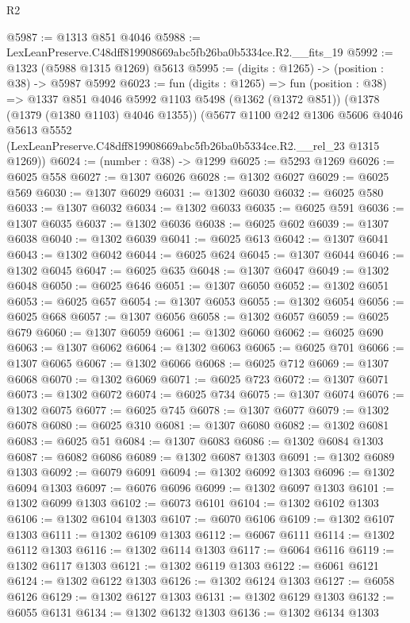 \begin{lexlean}{R2}
\begin{coremodule}
@5987 := @1313 @851 @4046
@5988 := LexLeanPreserve.C48dff819908669abc5fb26ba0b5334ce.R2.__fits_19
@5992 := @1323 (@5988 @1315 @1269) @5613
@5995 := (digits : @1265) -> (position : @38) -> @5987 @5992
@6023 := fun (digits : @1265) =>
  fun (position : @38) =>
  @1337
    @851
    @4046
    @5992
    @1103
    @5498
    (@1362 (@1372 @851))
    (@1378 (@1379 (@1380 @1103) @4046 @1355))
    (@5677
      @1100
      @242
      @1306
      @5606
      @4046
      @5613
      @5552
      (LexLeanPreserve.C48dff819908669abc5fb26ba0b5334ce.R2.__rel_23 @1315 @1269))
@6024 := (number : @38) -> @1299
@6025 := @5293 @1269
@6026 := @6025 @558
@6027 := @1307 @6026
@6028 := @1302 @6027
@6029 := @6025 @569
@6030 := @1307 @6029
@6031 := @1302 @6030
@6032 := @6025 @580
@6033 := @1307 @6032
@6034 := @1302 @6033
@6035 := @6025 @591
@6036 := @1307 @6035
@6037 := @1302 @6036
@6038 := @6025 @602
@6039 := @1307 @6038
@6040 := @1302 @6039
@6041 := @6025 @613
@6042 := @1307 @6041
@6043 := @1302 @6042
@6044 := @6025 @624
@6045 := @1307 @6044
@6046 := @1302 @6045
@6047 := @6025 @635
@6048 := @1307 @6047
@6049 := @1302 @6048
@6050 := @6025 @646
@6051 := @1307 @6050
@6052 := @1302 @6051
@6053 := @6025 @657
@6054 := @1307 @6053
@6055 := @1302 @6054
@6056 := @6025 @668
@6057 := @1307 @6056
@6058 := @1302 @6057
@6059 := @6025 @679
@6060 := @1307 @6059
@6061 := @1302 @6060
@6062 := @6025 @690
@6063 := @1307 @6062
@6064 := @1302 @6063
@6065 := @6025 @701
@6066 := @1307 @6065
@6067 := @1302 @6066
@6068 := @6025 @712
@6069 := @1307 @6068
@6070 := @1302 @6069
@6071 := @6025 @723
@6072 := @1307 @6071
@6073 := @1302 @6072
@6074 := @6025 @734
@6075 := @1307 @6074
@6076 := @1302 @6075
@6077 := @6025 @745
@6078 := @1307 @6077
@6079 := @1302 @6078
@6080 := @6025 @310
@6081 := @1307 @6080
@6082 := @1302 @6081
@6083 := @6025 @51
@6084 := @1307 @6083
@6086 := @1302 @6084 @1303
@6087 := @6082 @6086
@6089 := @1302 @6087 @1303
@6091 := @1302 @6089 @1303
@6092 := @6079 @6091
@6094 := @1302 @6092 @1303
@6096 := @1302 @6094 @1303
@6097 := @6076 @6096
@6099 := @1302 @6097 @1303
@6101 := @1302 @6099 @1303
@6102 := @6073 @6101
@6104 := @1302 @6102 @1303
@6106 := @1302 @6104 @1303
@6107 := @6070 @6106
@6109 := @1302 @6107 @1303
@6111 := @1302 @6109 @1303
@6112 := @6067 @6111
@6114 := @1302 @6112 @1303
@6116 := @1302 @6114 @1303
@6117 := @6064 @6116
@6119 := @1302 @6117 @1303
@6121 := @1302 @6119 @1303
@6122 := @6061 @6121
@6124 := @1302 @6122 @1303
@6126 := @1302 @6124 @1303
@6127 := @6058 @6126
@6129 := @1302 @6127 @1303
@6131 := @1302 @6129 @1303
@6132 := @6055 @6131
@6134 := @1302 @6132 @1303
@6136 := @1302 @6134 @1303

\end{coremodule}
\end{lexlean}
